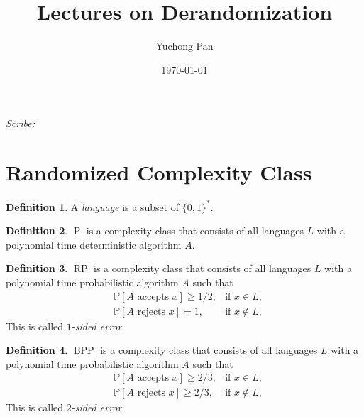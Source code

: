 \documentclass[letterpaper, reqno,11pt]{article}
\newcommand{\PP}{\mathbb{P}}
\DeclareMathOperator{\Poly}{P}
\DeclareMathOperator{\BPP}{BPP}
\DeclareMathOperator{\RP}{RP}
\begin{document}
\title{Lectures on Derandomization}
\author{Yuchong Pan}
\date{\today}
\newtheorem{theorem}{Theorem}
\newtheorem{lemma}[theorem]{Lemma}
\newtheorem{proposition}[theorem]{Proposition}
\newtheorem{corollary}[theorem]{Corollary}
\newtheorem{fact}[theorem]{Fact}
\newtheorem{problem}[theorem]{Problem}
\newtheorem{claim}{Claim}
\newtheorem{exercise}{Exercise}
\theoremstyle{definition}
\newtheorem{definition}[theorem]{Definition}
%

\begin{framed}
 \hfill \thedate
\begin{center}
\Large{\thetitle}
\end{center}
 \hfill {\em Scribe: \theauthor}
\end{framed}

\section{Randomized Complexity Class}

\begin{definition}
  A \emph{language} is a subset of $\{ 0, 1 \}^*$.
\end{definition}

\begin{definition}
  $\Poly$ is a complexity class that consists of all languages $L$ with a polynomial time deterministic algorithm $A$.
\end{definition}

\begin{definition}
  $\RP$ is a complexity class that consists of all languages $L$ with a polynomial time probabilistic algorithm $A$ such that
  \begin{align*}
    & \PP[\text{$A$ accepts $x$}] \geq 1/2, & \text{if $x \in L$}, \\
    & \PP[\text{$A$ rejects $x$}] = 1, & \text{if $x \not \in L$},
  \end{align*}
  This is called \emph{$1$-sided error}.
\end{definition}

\begin{definition}
  $\BPP$ is a complexity class that consists of all languages $L$ with a polynomial time probabilistic algorithm $A$ such that
  \begin{align*}
    & \PP[\text{$A$ accepts $x$}] \geq 2/3, & \text{if $x \in L$}, \\
    & \PP[\text{$A$ rejects $x$}] \geq 2/3, & \text{if $x \not \in L$},
  \end{align*}
  This is called \emph{$2$-sided error}.
\end{definition}
\end{document}
